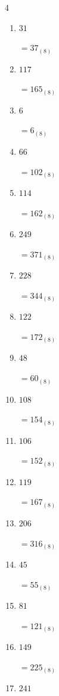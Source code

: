 \begin{multicols}{4}
\begin{enumerate}
  \item $31$

        $=37_{(8)}$

  \item $117$

        $=165_{(8)}$

  \item $6$

        $=6_{(8)}$

  \item $66$

        $=102_{(8)}$

  \item $114$

        $=162_{(8)}$

  \item $249$

        $=371_{(8)}$

\columnbreak %

  \item $228$

        $=344_{(8)}$

  \item $122$

        $=172_{(8)}$

  \item $48$

        $=60_{(8)}$

  \item $108$

        $=154_{(8)}$

  \item $106$

        $=152_{(8)}$

  \item $119$

        $=167_{(8)}$

  \item $206$

        $=316_{(8)}$

  \item $45$

        $=55_{(8)}$

  \item $81$

        $=121_{(8)}$

  \item $149$

        $=225_{(8)}$

  \item $241$


\end{enumerate}
\end{multicols}
